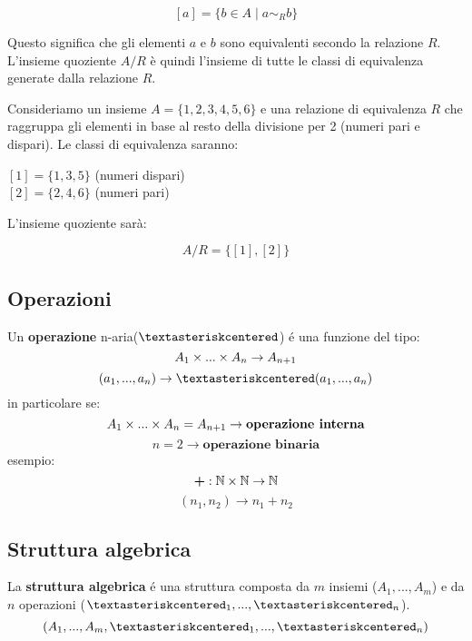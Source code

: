 \documentclass{article}
\begin{document}
\[
	[a] = \{ b \in A \mid a \sim_R b \}
\]

Questo significa che gli elementi \( a \) e \( b \) sono equivalenti secondo la
relazione \( R \). L'insieme quoziente \( A / R \) è quindi l'insieme di tutte
le classi di equivalenza generate dalla relazione \( R \).

Consideriamo un insieme \( A = \{1, 2, 3, 4, 5, 6\} \) e una relazione di
equivalenza \( R \) che raggruppa gli elementi in base al resto della divisione
per 2 (numeri pari e dispari). Le classi di equivalenza saranno:

\( [1] = \{1, 3, 5\} \) (numeri dispari)\\
\indent \( [2] = \{2, 4, 6\} \) (numeri pari)

L'insieme quoziente sarà:

\[
	A / R = \{ [1], [2] \}
\]

\newpage
\subsection{Operazioni}
Un \textbf{operazione} n-aria(\(\textasteriskcentered\)) é una funzione del
tipo:
\[
	A_1 \times ... \times A_n \to A_{n+1}\\
\]
\[
	(a_1, ... , a_n) \to \textasteriskcentered(a_1, ...  , a_n)
\]
in particolare se: \\
\[
	A_1 \times ... \times   A_n = A_{n+1} \to \textbf{operazione interna}\\
\]
\[
	n=2 \to \textbf{operazione binaria}
\]
esempio:\\
\[
	\textbf{+}: \mathbb{N} \times \mathbb{N} \to \mathbb{N}\\
\]
\[
	(n_1, n_2) \to n_1 + n_2
\]
\subsection{Struttura algebrica}
La \textbf{struttura algebrica} é una struttura composta da $m$ insiemi ($A_1,
	..., A_m$) e da $n$ operazioni ($\textasteriskcentered_1, ...,
	\textasteriskcentered_n$).
\[
	(A_1, ..., A_m , \textasteriskcentered_1, ..., \textasteriskcentered_n)
\]
\end{document}
